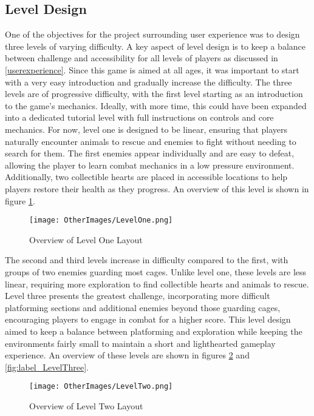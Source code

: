 \documentclass[]{final_report}
\begin{document}
\subsection{Level Design}
One of the objectives for the project surrounding user experience was to design three levels of varying difficulty. A key aspect of level design is to keep a balance between challenge and accessibility for all levels of players as discussed in \ref{userexperience}. \color{red}Since this game is aimed at all ages, it was important to start with a very easy introduction and gradually increase the difficulty. The three levels are of progressive difficulty, with the first level starting as an introduction to the game’s mechanics. Ideally, with more time, this could have been expanded into a dedicated tutorial level with full instructions on controls and core mechanics. For now, level one is designed to be linear, ensuring that players naturally encounter animals to rescue and enemies to fight without needing to search for them. The first enemies appear individually and are easy to defeat, allowing the player to learn combat mechanics in a low pressure environment. Additionally, two collectible hearts are placed in accessible locations to help players restore their health as they progress. An overview of this level is shown in figure \ref{fig:label_LevelOne}.

\begin{figure}[H]
    \centering
    \texttt{[image: OtherImages/LevelOne.png]}
    \caption{Overview of Level One Layout}
    \label{fig:label_LevelOne}
\end{figure}

The second and third levels increase in difficulty compared to the first, with groups of two enemies guarding most cages. Unlike level one, these levels are less linear, requiring more exploration to find collectible hearts and animals to rescue. Level three presents the greatest challenge, incorporating more difficult platforming sections and additional enemies beyond those guarding cages, encouraging players to engage in combat for a higher score. This level design aimed to keep a balance between platforming and exploration while keeping the environments fairly small to maintain a short and lighthearted gameplay experience. An overview of these levels are shown in figures \ref{fig:label_LevelTwo} and \ref{fig:label_LevelThree}. \newline

\begin{figure}[H]
    \centering
    \texttt{[image: OtherImages/LevelTwo.png]}
    \caption{Overview of Level Two Layout}
    \label{fig:label_LevelTwo}
\end{figure}
\end{document}
